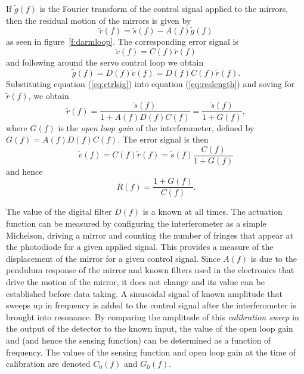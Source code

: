 If $\tilde{g}(f)$ is the Fourier transform of the control signal applied to
the mirrors, then the residual motion of the mirrors is given by 
\begin{equation}
\tilde{r}(f) = \tilde{s}(f) - A(f)\tilde{g}(f)
\label{eq:reslength}
\end{equation}
as seen in figure~\ref{f:darmloop}. The corresponding error signal is
\begin{equation}
\tilde{v}(f) = C(f) \tilde{r}(f)
\end{equation}
and following around the servo control loop we obtain
\begin{equation}
\tilde{g}(f) = D(f) \tilde{v}(f) = D(f) C(f) \tilde{r}(f).
\label{eq:ctrlsig}
\end{equation}
Substituting equation (\ref{eq:ctrlsig}) into equation (\ref{eq:reslength})
and soving for $\tilde{r}(f)$, we obtain
\begin{equation}
\tilde{r}(f) = \frac{\tilde{s}(f)}{1 + A(f)D(f)C(f)} = \frac{\tilde{s}(f)}{1 + G(f)},
\end{equation}
where $G(f)$ is the \emph{open loop gain} of the interferometer, defined by
$G(f) = A(f)D(f)C(f)$. The error signal is then
\begin{equation}
\tilde{v}(f) = C(f) \tilde{r}(f) = \tilde{s}(f) \frac{C(f)}{1 + G(f)}
\end{equation}
and hence
\begin{equation}
R(f) = \frac{1 + G(f)}{C(f)}.
\end{equation}

The value of the digital filter $D(f)$ is a known at all times.  The
actuation function can be measured by configuring the interferometer as a
simple Michelson, driving a mirror and counting the number of fringes that
appear at the photodiode for a given applied signal. This provides a measure
of the displacement of the mirror for a given control signal.  Since $A(f)$ is
due to the pendulum response of the mirror and known filters used in the
electronics that drive the motion of the mirror, it does not change and its
value can be established before data taking. A sinusoidal
signal of known amplitude that sweeps up in frequency is added to the control
signal after the interferometer is brought into resonance. By comparing the
amplitude of this \emph{calibration sweep} in the output of the detector to
the known input, the value of the open loop
gain and (and hence the sensing function) can be determined as a function of
frequency. The values of the
sensing function and open loop gain at the time of calibration are denoted
$C_0(f)$ and $G_0(f)$.

